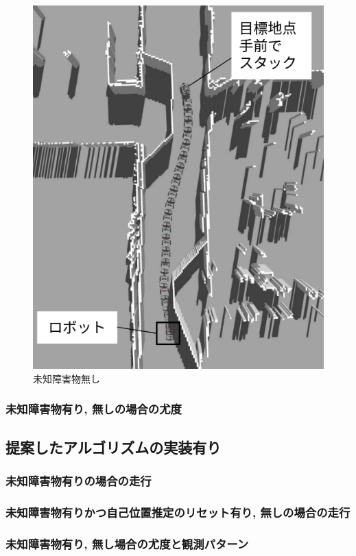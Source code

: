 \begin{figure}[htbp]
\begin{minipage}[b]{0.5\linewidth}
    \includegraphics[keepaspectratio, scale=0.32]{figs/no_implementation_with_reset.png}
    \caption{未知障害物無し}
    \label{fig:gazebo_known}
  \end{minipage}
\end{figure}

\subsubsection{未知障害物有り, 無しの場合の尤度}

\subsection{提案したアルゴリズムの実装有り}

\subsubsection{未知障害物有りの場合の走行}

\subsubsection{未知障害物有りかつ自己位置推定のリセット有り, 無しの場合の走行}

\subsubsection{未知障害物有り, 無し場合の尤度と観測パターン}

